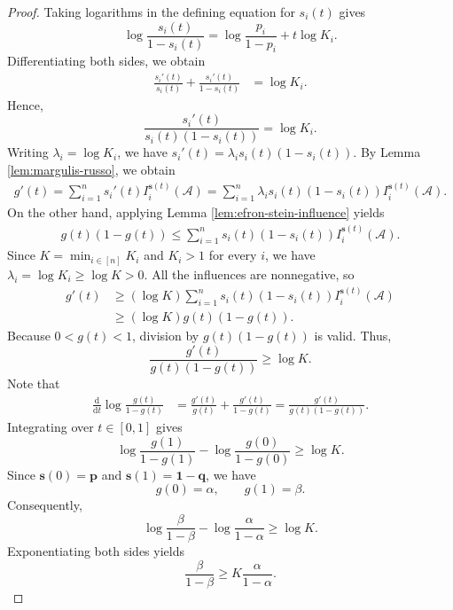 \documentclass[11pt]{article}
\numberwithin{equation}{section}
\theoremstyle{definition}
\theoremstyle{remark}
\begin{document}
\begin{proof}
Taking logarithms in the defining equation for $s_i(t)$ gives
\begin{equation*}
 \log\frac{s_i(t)}{1-s_i(t)}
 =
 \log\frac{p_i}{1-p_i}+t\log K_i.
\end{equation*}
Differentiating both sides, we obtain
\begin{align*}
 \frac{s_i'(t)}{s_i(t)}
 +
 \frac{s_i'(t)}{1-s_i(t)}
 &=
 \log K_i.
\end{align*}
Hence,
\begin{equation*}
 \frac{s_i'(t)}
 {s_i(t)(1-s_i(t))}
 =
 \log K_i.
\end{equation*}
Writing $\lambda_i=\log K_i$, we have
$
 s_i'(t)
 =
 \lambda_i s_i(t)(1-s_i(t)).
$
By Lemma \ref{lem:margulis-russo},  we obtain
\begin{align*}
 g'(t)
 =
 \sum_{i=1}^n
 s_i'(t)I_i^{\mathbf s(t)}(\mathcal{A})=
 \sum_{i=1}^n
 \lambda_i s_i(t)(1-s_i(t))
 I_i^{\mathbf s(t)}(\mathcal{A}).
\end{align*}
On the other hand, applying Lemma \ref{lem:efron-stein-influence}  yields
\begin{align*}
 g(t)(1-g(t))\leq
 \sum_{i=1}^n
 s_i(t)(1-s_i(t))
 I_i^{\mathbf s(t)}(\mathcal{A}).
\end{align*}
Since $K=\min_{i\in[n]}K_i$ and $K_i>1$ for every $i$, we have
$
 \lambda_i=\log K_i\geq\log K>0.
$
All the influences are nonnegative, so
\begin{align*}
 g'(t)
 &\geq
 (\log K)
 \sum_{i=1}^n
 s_i(t)(1-s_i(t))
 I_i^{\mathbf s(t)}(\mathcal{A})\\
 &\geq
 (\log K)g(t)(1-g(t)).
\end{align*}
Because $0<g(t)<1$, division by $g(t)(1-g(t))$ is valid. Thus,
\begin{equation*}
 \frac{g'(t)}{g(t)(1-g(t))}
 \geq
 \log K.
\end{equation*}
Note that
\begin{align*}
 \frac{\mathrm d}{\mathrm dt}
 \log\frac{g(t)}{1-g(t)}
 &=
 \frac{g'(t)}{g(t)}
 +
 \frac{g'(t)}{1-g(t)}=
 \frac{g'(t)}{g(t)(1-g(t))}.
\end{align*}
Integrating over $t\in[0,1]$  gives
\begin{equation*}
 \log\frac{g(1)}{1-g(1)}
 -
 \log\frac{g(0)}{1-g(0)}
 \geq
 \log K.
\end{equation*}
Since $\mathbf s(0)=\mathbf p$ and
$\mathbf s(1)=\mathbf 1-\mathbf q$, we have
\begin{equation*}
 g(0)=\alpha,
 \qquad
 g(1)=\beta.
\end{equation*}
Consequently,
\begin{equation*}
 \log\frac{\beta}{1-\beta}
 -
 \log\frac{\alpha}{1-\alpha}
 \geq
 \log K.
\end{equation*}
Exponentiating both sides yields
\begin{equation*}
 \frac{\beta}{1-\beta}
 \geq
 K\frac{\alpha}{1-\alpha}.
\end{equation*}


\end{proof}
\end{document}
